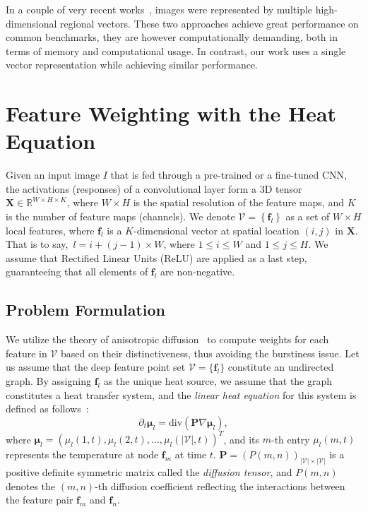 \documentclass[journal]{IEEEtran}
\begin{document}
In a couple of very recent works~\cite{iscen2017efficient,iscen2017fast},
images were represented by multiple high-dimensional regional vectors.
These two approaches achieve great performance on common benchmarks, they are however computationally demanding, both in terms of
memory and computational usage. In contrast, our work uses a single vector representation while achieving similar performance.

\section{Feature Weighting with the Heat Equation}\label{sec:feature_weighting}
Given an input image $I$ that is fed through a pre-trained or a fine-tuned CNN,
the activations (responses) of a convolutional layer form a 3D tensor
$\boldsymbol{X} \in \mathbb{R}^{W\times H \times K}$, where $W \times H$ is the spatial resolution of the feature maps,
and $K$ is the number of feature maps (channels).
We denote $\mathcal {V}= \left\{\boldsymbol{f}_{l}\right\}$ as a set of $W \times H$ local features,
where $\boldsymbol{f}_{l}$ is a $K$-dimensional vector  at spatial location $(i,j)$  in $\boldsymbol{X}$.
That is to say,~$l = i+(j-1)\times W$, where $1 \leq i \leq W$ and $1 \leq j \leq H$.
We assume that Rectified Linear Units (ReLU) are applied as a last step,
guaranteeing that all elements of $\boldsymbol{f}_{l}$ are non-negative.

\subsection{Problem Formulation}
We utilize the theory of anisotropic diffusion~\cite{weickert1998anisotropic}
to compute weights for each feature in $\mathcal {V}$  based on their distinctiveness, thus avoiding
the burstiness issue. Let us assume that the deep feature point set $\mathcal {V} = \{\boldsymbol{f}_l\}$ constitute an undirected graph. By assigning $\boldsymbol{f}_l$ as the unique heat source, we assume that the graph constitutes a  heat transfer system, and the \emph{linear heat equation} for this system is defined as follows~\cite{weickert1998anisotropic}:
\begin{equation}
\partial_t\boldsymbol{\mu}_l = \text{div}(\boldsymbol{P}\nabla \boldsymbol{\mu}_l),
\end{equation}
where $\boldsymbol{\mu}_l = (\mu_l(1,t), \mu_l(2,t),\ldots, \mu_l(|\mathcal {V}|,t))^{T}$, and its $m$-th entry $\mu_l(m,t)$ represents the temperature at node $\boldsymbol{f}_m$ at time $t$.
$\boldsymbol{P} = (P(m,n))_{|\mathcal {V}|\times |\mathcal {V}|}$ is a positive definite symmetric matrix
called the \emph{diffusion tensor},  and $P(m,n)$ denotes the $(m,n)$-th diffusion coefficient reflecting the interactions between the feature pair $\boldsymbol{f}_m$ and $\boldsymbol{f}_n$.
\end{document}
